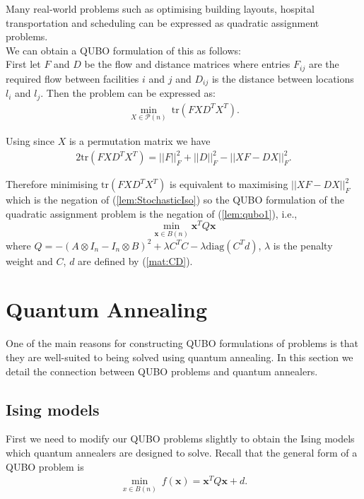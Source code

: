 \documentclass{article}
\begin{document}
\noindent Many real-world problems such as optimising building layouts, hospital transportation and scheduling can be expressed as quadratic assignment problems.\\

\noindent We can obtain a QUBO formulation of this as follows: \\
First let \(F\) and \(D\) be the flow and distance matrices where entries \(F_{ij}\) are the required flow between facilities \(i\) and \(j\) and \(D_{ij}\) is the distance between locations \(l_i\) and \(l_j\). Then the problem can be expressed as:
\begin{align*}
    \min_{X \in \mathcal{P}(n)} \: \text{tr}(FXD^TX^T).
\end{align*}

\noindent Using \cite[p.~3]{klus2023continuous} since \(X\) is a permutation matrix we have
\begin{align*}
    2\text{tr}(FXD^TX^T) = ||F||_F^2 + ||D||_F^2 - ||XF - DX||_F^2.
\end{align*}

\noindent Therefore minimising \(\text{tr}(FXD^TX^T)\) is equivalent to maximising \(||XF - DX||_F^2\) which is the negation of (\ref{lem:StochasticIso}) so the QUBO formulation of the quadratic assignment problem is the negation of (\ref{lem:qubo1}), i.e.,
\begin{equation*}
	\min_{\mathbf{x} \in B(n)} \mathbf{x}^T Q \mathbf{x}
\end{equation*}
where \(Q = -(A \otimes I_n - I_n \otimes B)^2 + \lambda C^T C -\lambda\text{diag}(C^T d)\), \(\lambda\) is the penalty weight and \(C\), \(d\) are defined by (\ref{mat:CD}).\\

\section{Quantum Annealing}

One of the main reasons for constructing QUBO formulations of problems is that they are well-suited to being solved using quantum annealing. In this section we detail the connection between QUBO problems and quantum annealers. 

\subsection{Ising models}

First we need to modify our QUBO problems slightly to obtain the Ising models which quantum annealers are designed to solve.
Recall that the general form of a QUBO problem is
\begin{align*}
    \min_{x \in B(n)} \: f(\mathbf{x}) = \mathbf{x}^T Q \mathbf{x} + d.
\end{align*}
\end{document}
